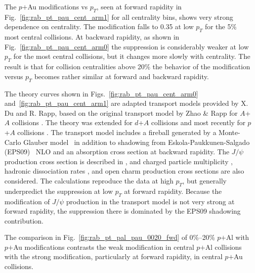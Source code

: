 \documentclass[twocolumn,letterpaper,aps,prc,longbibliography,superscriptaddress,nofootinbib,floatfix]{revtex4-1}
\newcommand{\pt}{\mbox{$p_T$}\xspace}
\newcommand{\pau}{\mbox{$p$$+$Au}\xspace}
\newcommand{\pal}{\mbox{$p$$+$Al}\xspace}
\newcommand{\jpsi}{\mbox{$J/\psi$}\xspace}
\begin{document}
The \pau modifications vs \pt, seen at forward rapidity in 
Fig.~\ref{fig:rab_pt_pau_cent_arm1} for all centrality bins, shows very 
strong dependence on centrality. The modification falls to 0.35 at low 
\pt for the 5\% most central collisions.  At backward rapidity, as shown 
in Fig.~\ref{fig:rab_pt_pau_cent_arm0} the suppression is considerably 
weaker at low \pt for the most central collisions, but it changes more 
slowly with centrality. The result is that for collision centralities 
above 20\% the behavior of the modification versus \pt becomes rather 
similar at forward and backward rapidity.

The theory curves shown in Figs.~\ref{fig:rab_pt_pau_cent_arm0} 
and~\ref{fig:rab_pt_pau_cent_arm1} are adapted transport models provided 
by X. Du and R. Rapp, based on the original transport model by Zhao \& 
Rapp for $A$+$A$ collisions \cite{Zhao:2010nk}.  The theory was extended 
for $d$+$A$ collisions \cite{Du:2015wha} and most recently for $p$+$A$ 
collisions \cite{Du:2018wsj}.  The transport model includes a fireball 
generated by a Monte-Carlo Glauber model~\cite{Loizides:2014vua} in addition to 
shadowing from Eskola-Paukkunen-Salgado (EPS09)~\cite{Eskola:2009uj}
NLO and an absorption cross section at backward rapidity.  
The \jpsi production cross section is described in 
\cite{Du:2018wsj}, and charged particle multiplicity 
\cite{Adare:2018toe}, hadronic dissociation rates \cite{Du:2015wha}, and 
open charm production cross sections \cite{Du:2018wsj} are also 
considered. The calculations reproduce the data at high \pt, but 
generally underpredict the suppression at low \pt at forward rapidity. 
Because the modification of \jpsi production in the transport model is 
not very strong at forward rapidity, the suppression there is dominated 
by the EPS09 shadowing contribution.

The comparison in Fig.~\ref{fig:rab_pt_pal_pau_0020_fwd} of 0\%--20\% 
\pal with \pau modifications contrasts the weak modification in central 
\pal collisions with the strong modification, particularly at forward 
rapidity, in central \pau collisions.
\end{document}
